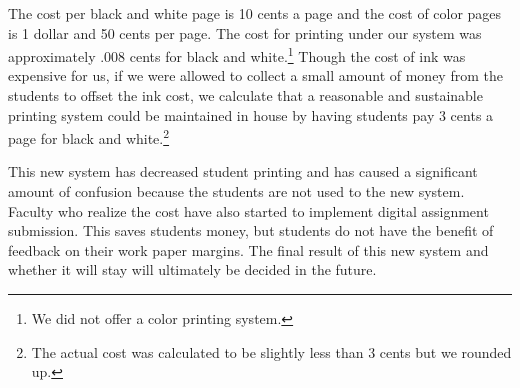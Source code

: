 The cost per black and white page is 10 cents a page and the cost of color pages is 1 dollar and 50 cents per page.  The cost for printing under our system was approximately .008 cents for black and white.\footnote{We did not offer a color printing system.}  Though the cost of ink was expensive for us, if we were allowed to collect a small amount of money from the students to offset the ink cost, we calculate that a reasonable and sustainable printing system could be maintained in house by having students pay 3 cents a page for black and white.\footnote{The actual cost was calculated to be slightly less than 3 cents but we rounded up.}  

This new system has decreased student printing and has caused a significant amount of confusion because the students are not used to the new system.  Faculty who realize the cost have also started to implement digital assignment submission.  This saves students money, but students do not have the benefit of feedback on their work paper margins.  The final result of this new system and whether it will stay will ultimately be decided in the future.  

